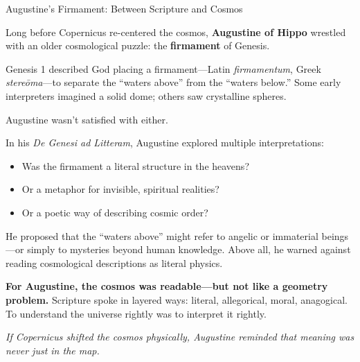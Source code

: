 \begin{HistoricalSidebar}{Augustine’s Firmament: Between Scripture and Cosmos}

  Long before Copernicus re-centered the cosmos, \textbf{Augustine of Hippo} wrestled with an older cosmological puzzle: the \textbf{firmament} of Genesis.

  \medskip
  
  Genesis 1 described God placing a firmament—Latin \emph{firmamentum}, Greek \emph{stereōma}—to separate the “waters above” from the “waters below.” Some early interpreters imagined a solid dome; others saw crystalline spheres.

  \medskip
  
  Augustine wasn’t satisfied with either.

  \medskip
  
  In his \emph{De Genesi ad Litteram}, Augustine explored multiple interpretations:

  \medskip
  
  \begin{itemize}
    \item Was the firmament a literal structure in the heavens?
    \item Or a metaphor for invisible, spiritual realities?
    \item Or a poetic way of describing cosmic order?
  \end{itemize}

  \medskip
  
  He proposed that the “waters above” might refer to angelic or immaterial beings—or simply to mysteries beyond human knowledge. Above all, he warned against reading cosmological descriptions as literal physics.
  
  \medskip
  
  \textbf{For Augustine, the cosmos was readable—but not like a geometry problem.} Scripture spoke in layered ways: literal, allegorical, moral, anagogical. To understand the universe rightly was to interpret it rightly.
  
  \medskip
  
  \begin{center}
  \emph{If Copernicus shifted the cosmos physically, Augustine reminded that meaning was never just in the map.}
  \end{center}
  
\end{HistoricalSidebar}